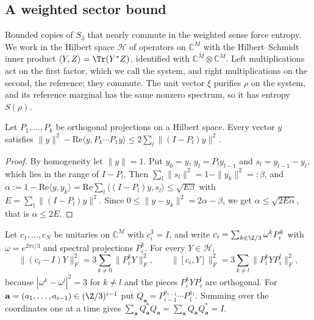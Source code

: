 \subsection{A weighted sector bound}

Rounded copies of $S_3$ that nearly commute in the weighted sense force entropy. We work in the Hilbert space $\mathcal H$ of operators on
$\mathbb C^M$ with the Hilbert--Schmidt inner product $\langle Y,Z\rangle=\Tr(Y^*Z)$, identified with $\mathbb C^M\otimes\mathbb C^M$. Left multiplications
act on the first factor, which we call the system, and right multiplications on the second, the reference; they commute. The unit vector $\xi$
purifies $\rho$ on the system, and its reference marginal has the same nonzero spectrum, so it has entropy $S(\rho)$.

\begin{lemma}\label{lem:projection-product}
Let $P_1,\dots,P_k$ be orthogonal projections on a Hilbert space. Every vector $y$ satisfies
$\|y\|^2-\mathrm{Re}\langle y,P_k\cdots P_1y\rangle\le2\sum_l\|(I-P_l)y\|^2$.
\end{lemma}

\begin{proof}
By homogeneity let $\|y\|=1$. Put $y_0=y$, $y_l=P_ly_{l-1}$ and $s_l=y_{l-1}-y_l$, which lies in the range of $I-P_l$. Then
$\sum_l\|s_l\|^2=1-\|y_k\|^2=:\beta$, and $\alpha:=1-\mathrm{Re}\langle y,y_k\rangle=\mathrm{Re}\sum_l\langle(I-P_l)y,s_l\rangle\le\sqrt{E\beta}$ with
$E=\sum_l\|(I-P_l)y\|^2$. Since $0\le\|y-y_k\|^2=2\alpha-\beta$, we get $\alpha\le\sqrt{2E\alpha}$, that is $\alpha\le2E$.
\end{proof}

Let $c_1,\dots,c_N$ be unitaries on $\mathbb C^M$ with $c_i^3=I$, and write $c_i=\sum_{k\in\Z/3}\omega^kP_i^k$ with $\omega=e^{2\pi i/3}$ and spectral
projections $P_i^k$. For every $Y\in\mathcal H$,
\begin{equation}\label{eq:spectral-identities}
\|(c_i-I)Y\|_F^2=3\sum_{k\ne0}\|P_i^kY\|_F^2,\qquad\|[c_i,Y]\|_F^2=3\sum_{k\ne l}\|P_i^kYP_i^l\|_F^2,
\end{equation}
because $|\omega^k-\omega^l|^2=3$ for $k\ne l$ and the pieces $P_i^kYP_i^l$ are orthogonal. For $\mathbf a=(a_1,\dots,a_{i-1})\in(\Z/3)^{i-1}$ put
$Q_{\mathbf a}=P_{i-1}^{a_{i-1}}\cdots P_1^{a_1}$. Summing over the coordinates one at a time gives
$\sum_{\mathbf a}Q_{\mathbf a}^*Q_{\mathbf a}=\sum_{\mathbf a}Q_{\mathbf a}Q_{\mathbf a}^*=I$.

